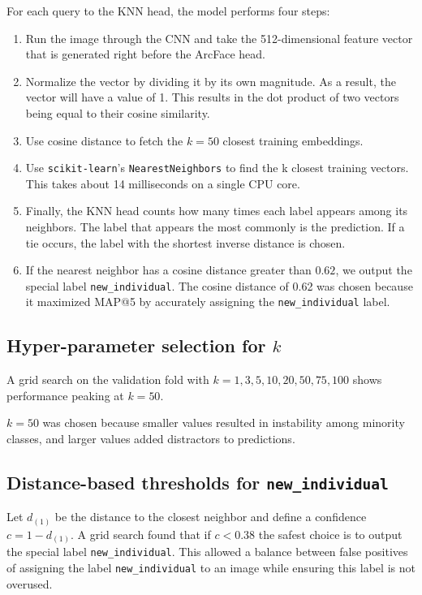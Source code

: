 \documentclass[twocolumn]{article}
\begin{document}
For each query to the KNN head, the model performs four steps:
\begin{enumerate}
    \item Run the image through the CNN and take the 512-dimensional feature vector that is generated right before the ArcFace head.
    \item Normalize the vector by dividing it by its own magnitude. As a result, the vector will have a value of 1. This results in the dot product of two vectors being equal to their cosine similarity.
    \item Use cosine distance to fetch the $k=50$ closest training embeddings.
    \item Use \texttt{scikit-learn}'s \texttt{NearestNeighbors} to find the k closest training vectors. This takes about 14 milliseconds on a single CPU core.
    \item Finally, the KNN head counts how many times each label appears among its neighbors.  The label that appears the most commonly is the prediction. If a tie occurs, the label with the shortest inverse distance is chosen.
    \item If the nearest neighbor has a cosine distance greater than $0.62$, we output the special label \texttt{new\_individual}. The cosine distance of 0.62 was chosen because it maximized MAP@5 by accurately assigning the \texttt{new\_individual} label.
\end{enumerate}

\subsection{Hyper-parameter selection for $k$}

A grid search on the validation fold with $k\!=\!1,3,5,10,20,50,75,100$ shows performance peaking at $k=50$. 

$k=50$ was chosen because smaller values resulted in instability among minority classes, and larger values added distractors to predictions.

\subsection{Distance-based thresholds for \texttt{new\_individual}}

Let $d_{(1)}$ be the distance to the closest neighbor and define a confidence $c = 1 - d_{(1)}$.
A grid search found that if $c < 0.38$ the safest choice is to output the special label \texttt{new\_individual}.
This allowed a balance between false positives of assigning the label \texttt{new\_individual} to an image while ensuring this label is not overused.
\end{document}
